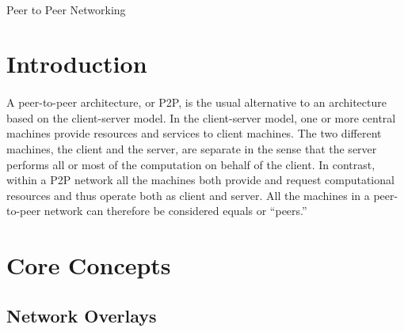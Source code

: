 \documentclass[12pt,letterpaper]{article}
\begin{document}
\onehalfspacing

\paragraph{}
\begin{center}
\Large Peer to Peer Networking
\end{center}

\section{Introduction}

\paragraph{}
A peer-to-peer architecture, or P2P, is the usual alternative to an architecture based on the client-server model.
In the client-server model, one or more central machines provide resources and services to client machines.
The two different machines, the client and the server, are separate in the sense that the server performs all or most of the computation on behalf of the client.
In contrast, within a P2P network all the machines both provide and request computational resources and thus operate both as client and server. All the machines in a peer-to-peer network can therefore be considered equals or ``peers.''



\section{Core Concepts}

\subsection{Network Overlays}
\end{document}

